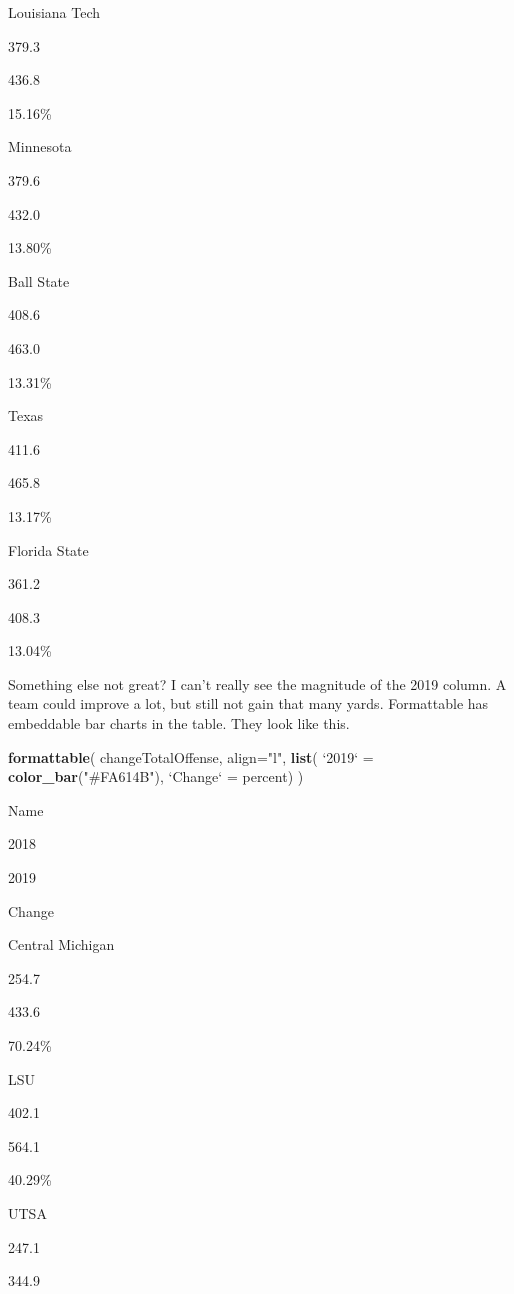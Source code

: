 \documentclass[]{book}
\newenvironment{Shaded}{\begin{snugshade}}{\end{snugshade}}
\newcommand{\DataTypeTok}[1]{\textcolor[rgb]{0.13,0.29,0.53}{#1}}
\newcommand{\KeywordTok}[1]{\textcolor[rgb]{0.13,0.29,0.53}{\textbf{#1}}}
\newcommand{\NormalTok}[1]{#1}
\newcommand{\StringTok}[1]{\textcolor[rgb]{0.31,0.60,0.02}{#1}}
\begin{document}
Louisiana Tech

379.3

436.8

15.16\%

Minnesota

379.6

432.0

13.80\%

Ball State

408.6

463.0

13.31\%

Texas

411.6

465.8

13.17\%

Florida State

361.2

408.3

13.04\%

Something else not great? I can't really see the magnitude of the 2019 column. A team could improve a lot, but still not gain that many yards. Formattable has embeddable bar charts in the table. They look like this.

\begin{Shaded}
\begin{Highlighting}[]
\KeywordTok{formattable}\NormalTok{(}
\NormalTok{  changeTotalOffense, }
  \DataTypeTok{align=}\StringTok{"l"}\NormalTok{,}
  \KeywordTok{list}\NormalTok{(}
    \StringTok{`}\DataTypeTok{2019}\StringTok{`}\NormalTok{ =}\StringTok{ }\KeywordTok{color_bar}\NormalTok{(}\StringTok{"#FA614B"}\NormalTok{), }
    \StringTok{`}\DataTypeTok{Change}\StringTok{`}\NormalTok{ =}\StringTok{ }\NormalTok{percent)}
\NormalTok{  )}
\end{Highlighting}
\end{Shaded}

Name

2018

2019

Change

Central Michigan

254.7

{433.6}

70.24\%

LSU

402.1

{564.1}

40.29\%

UTSA

247.1

{344.9}
\end{document}
